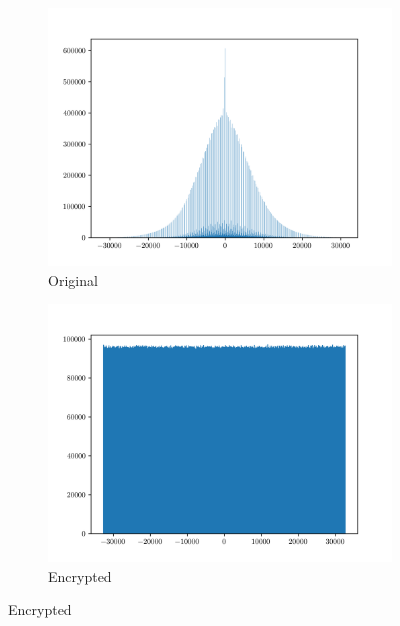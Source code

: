 \documentclass[a4paper]{cas-sc}
\begin{document}
\begin{figure}[pos=h]
    \begin{subfigure}[h]{0.3\textwidth}
        \begin{center}
            \includegraphics[width=\textwidth]{embedded2Histogram.png}
            \caption{Original}
            \label{fig:embedded2Histogram}
        \end{center}
    \end{subfigure}
    \begin{subfigure}[h]{0.3\textwidth}
        \begin{center}
            \includegraphics[width=\textwidth]{encrypted2Histogram.png}
            \caption{Encrypted}
            \label{fig:encrypted2Histogram}

\end{center}
\end{subfigure}
\end{figure}
\end{document}
